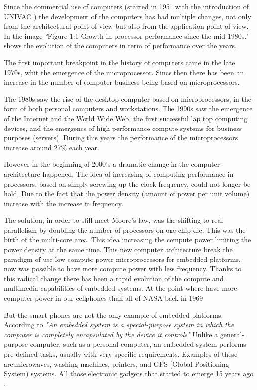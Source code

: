 Since the commercial use of computers (started in 1951 with the
introduction of UNIVAC \cite{Nur}) the development of the computers has had
multiple changes, not only from the architectural point of view but also from
the application point of view. In \cite{Hennessy} the image \textit"{Figure 1:1
Growth in processor performance since the mid-1980s."} shows the evolution of
the computers in term of performance over the years. 

The first important breakpoint in the history of computers came in the late
1970s, whit the emergence of the microprocessor. Since then there has been an
increase in the number of computer business being based on microprocessors. 

The 1980s saw the rise of the desktop computer based on microprocessors, in the
form of both personal computers and workstations. The 1990s saw the emergence
of the Internet and the World Wide Web, the first successful lap top computing
devices, and the emergence of high performance compute systems for business
purposes (servers). During this years the performance of the microprocessors
increase around 27\% each year.\cite{Hennessy}

However in the beginning of 2000's a dramatic change in the computer
architecture happened. The idea of increasing of computing performance in
processors, based on simply screwing up the clock frequency, could not longer
be hold. Due to the fact that the power density (amount of power per unit
volume) increase with the increase in frequency.

The solution, in order to still meet Moore's law, was the shifting to real
parallelism by doubling the number of processors on one chip die. This was the
birth of the multi-core area. This idea increasing the compute power limiting
the power density at the same time. This new computer architecture break the
paradigm of use low compute power microprocessors for embedded platforms, now was possible to have more compute power with less frequency.
Thanks to this radical change there has been a rapid evolution of the compute
and multimedia capabilities of embedded systems. At the point where have more
computer power in our cellphones than all of NASA back in 1969 \cite{Michio}



But the smart-phones are not the only example of embedded platforms.
According to \cite{Hallinan} \textit{"An embedded system is a special-purpose
system in which the computer is completely encapsulated by the device it
controls"} Unlike a general-purpose computer, such as a personal
computer, an embedded system performs pre-defined tasks, usually with very
specific requirements. Examples of these are:microwaves, washing machines, printers,
and GPS (Global Positioning System) systems. All those electronic
gadgets that started to emerge 15 years ago \cite{Nur}.

